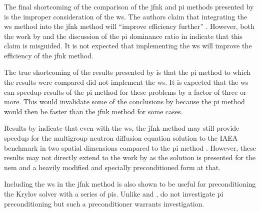     \subsubsection{}
    \label{sec:wielandt_shift}

      The final shortcoming of the comparison of the \gls{jfnk} and \gls{pi}
      methods presented by \citeauthor{qe2paper} is the improper consideration
      of the \gls{ws}. The authors claim that integrating the \gls{ws} method
      into the \gls{jfnk} method will ``improve efficiency further''
      \cite{qe2paper}. However, both the work by \citeauthor{gill_azmy} and the
      discussion of the \gls{pi} dominance ratio in 
      indicate that this claim is misguided. It is not expected that
      implementing the \gls{ws} will improve the efficiency of the \gls{jfnk}
      method.

      The true shortcoming of the results presented by \citeauthor{qe2paper} is
      that the \gls{pi} method to which the results were compared did not
      implement the \gls{ws}. It is expected that the \gls{ws} can speedup
      results of the \gls{pi} method for these problems by a factor of three or
      more. This would invalidate some of the conclusions by
      \citeauthor{qe2paper} because the \gls{pi} method would then be faster
      than the \gls{jfnk} method for some cases.

      Results by \citeauthor{jfnk_wielandt} indicate that even with the
      \gls{ws}, the \gls{jfnk} method may still provide speedup for the
      multigroup neutron diffusion equation solution to the IAEA benchmark in
      two spatial dimensions compared to the \gls{pi} method
      \cite{jfnk_wielandt}. However, these results may not directly extend to
      the work by \citeauthor{qe2paper} as the solution is presented for the
      \gls{nem} and a heavily modified and specially preconditioned form at
      that.

      Including the \gls{ws} in the \gls{jfnk} method is also shown to be useful
      for preconditioning the Krylov solver with a series of \glspl{pi}. Unlike
      \citeauthor{gill_azmy} and \citeauthor{jfnk_wielandt},
      \citeauthor{qe2paper} do not investigate \gls{pi} preconditioning but such
      a preconditioner warrants investigation.
